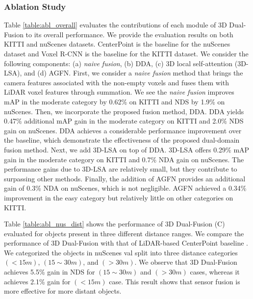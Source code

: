 \documentclass[lettersize,journal]{IEEEtran}
\begin{document}
\subsubsection{Ablation Study}
 Table \ref{table:abl_overall} evaluates the contributions of each module of 3D Dual-Fusion to its overall performance.   We provide the evaluation results on both KITTI and nuScenes datasets. CenterPoint \cite{centerpoint} is the baseline for the nuScenes dataset and Voxel R-CNN \cite{voxelrcnn} is the baseline for the KITTI dataset. 
 We consider the following components: (a) \textit{naive fusion}, (b) DDA, (c) 3D local self-attention (3D-LSA), and (d) AGFN. 
 First, we consider a {\it naive fusion} method that brings the camera features associated with the non-empty voxels  and fuses them with LiDAR voxel features through summation. We see the \textit{naive fusion} improves mAP in the moderate category by 0.62\% on KITTI and NDS by 1.9\% on nuScenes. 
 Then, we incorporate the proposed fusion method, DDA.  
 DDA yields  0.47\% additional mAP gain in the moderate category on KITTI and 2.0\% NDS gain on nuScenes. DDA achieves a considerable performance improvement over the baseline, which  
demonstrate the effectiveness of the proposed dual-domain fusion method.  Next, we add 3D-LSA on top of DDA. 3D-LSA offers 0.29\% mAP gain in the moderate category on KITTI and 0.7\% NDA gain on nuScenes. The performance gains due to 3D-LSA are relatively small, but they contribute to surpassing other methods. Finally, the addition of AGFN provides an additional gain of 0.3\% NDA on nuScenes, which is not negligible. AGFN achieved a 0.34\% improvement in the easy category but relatively little on other categories on KITTI. 

Table \ref{table:abl_nus_dist} shows the performance of 3D Dual-Fusion (C) evaluated for objects present in three different distance ranges. We compare the performance of 3D Dual-Fusion with that of LiDAR-based CenterPoint baseline \cite{centerpoint}. We categorized the objects in nuScenes val split into three distance categories $(<15m)$, $(15\sim30m)$, and $(>30m)$. We observe that 3D Dual-Fusion achieves 5.5\% gain in NDS for $(15\sim30m)$ and $(>30m)$ cases, whereas it achieves 2.1\% gain for $(<15m)$ case. 
 This result shows that sensor fusion is more effective for more distant objects.
\end{document}
